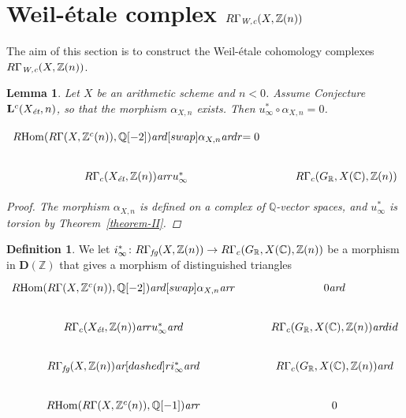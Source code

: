 \documentclass[leqno,12pt]{article}
\theoremstyle{plain}
\newtheorem{lemma}[theorem]{\indent\sc Lemma}
\theoremstyle{definition}
\newtheorem{definition}[theorem]{\indent\sc Definition}
\DeclareMathOperator{\Hom}{Hom}
\newcommand{\CC}{\mathbb{C}}
\newcommand{\QQ}{\mathbb{Q}}
\newcommand{\RR}{\mathbb{R}}
\newcommand{\ZZ}{\mathbb{Z}}
\newcommand{\Wc}{\text{\it W,c}}
\newcommand{\ar}{\text{\it ar}}
\newcommand{\et}{\text{\it \'{e}t}}
\newcommand{\fg}{\text{\it fg}}
\newcommand{\RHom}{R\!\Hom}
\newcommand{\DZ}{{\mathbf{D} (\ZZ)}}
\begin{document}

\section{Weil-\'{e}tale complex $R\Gamma_\Wc (X, \ZZ(n))$}
\label{sec:RGamma-Wc}

The aim of this section is to construct the Weil-\'{e}tale cohomology complexes
$R\Gamma_\Wc (X, \ZZ(n))$.

\begin{lemma}
  Let $X$ be an arithmetic scheme and $n < 0$. Assume Conjecture
  $\mathbf{L}^c (X_\et, n)$, so that the morphism $\alpha_{X,n}$ exists.
  Then $u_\infty^* \circ \alpha_{X,n} = 0$.

  \[ \begin{tikzcd}
    \RHom (R\Gamma (X, \ZZ^c (n)), \QQ [-2]) \ar{d}[swap]{\alpha_{X,n}}\ar{dr}{= 0} \\
      R\Gamma_c (X_\et, \ZZ (n)) \ar{r}{u_\infty^*} & R\Gamma_c (G_\RR, X (\CC), \ZZ (n))
    \end{tikzcd} \]

  \begin{proof}
    The morphism $\alpha_{X,n}$ is defined on a complex of $\QQ$-vector spaces,
    and $u_\infty^*$ is torsion by Theorem~\ref{theorem-II}.
  \end{proof}
\end{lemma}

\begin{definition}
  \label{dfn:i-infty}
  We let
  $i_\infty^*\colon R\Gamma_\fg (X, \ZZ (n)) \to R\Gamma_c (G_\RR, X (\CC), \ZZ (n))$
  be a morphism in $\DZ$ that gives a morphism of distinguished triangles
  \begin{equation}
    \label{eqn:triangle-defining-i-infty}
    \begin{tikzcd}
      \RHom (R\Gamma (X, \ZZ^c (n)), \QQ [-2]) \ar{d}[swap]{\alpha_{X,n}}\ar{r} & 0\ar{d} \\
      R\Gamma_c (X_\et, \ZZ (n)) \ar{r}{u_\infty^*}\ar{d} &  R\Gamma_c (G_\RR, X (\CC), \ZZ (n)) \ar{d}{id} \\
      R\Gamma_\fg (X, \ZZ (n)) \ar[dashed]{r}{i_\infty^*}\ar{d} & R\Gamma_c (G_\RR, X (\CC), \ZZ (n)) \ar{d} \\
      \RHom (R\Gamma (X, \ZZ^c (n)), \QQ [-1])\ar{r} & 0 \\
    \end{tikzcd}
  \end{equation}
\end{definition}
\end{document}

